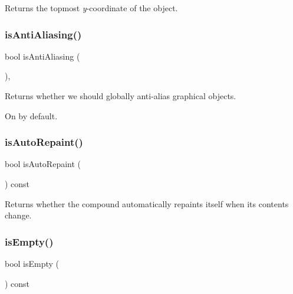 Returns the topmost {\itshape y}-\/coordinate of the object. 

\mbox{\label{classGObject_a93be0e1fe1b1bf1a1da732470c94f42b}} 
\subsubsection{\texorpdfstring{is\+Anti\+Aliasing()}{isAntiAliasing()}}
{\footnotesize\ttfamily bool is\+Anti\+Aliasing (\begin{DoxyParamCaption}{ }\end{DoxyParamCaption})\hspace{0.3cm}{\ttfamily [static]}, {\ttfamily [inherited]}}



Returns whether we should globally anti-\/alias graphical objects. 

On by default. \mbox{\label{classGCompound_a12c8d52ddfcaa5448ec4bace92ddee6c}} 
\subsubsection{\texorpdfstring{is\+Auto\+Repaint()}{isAutoRepaint()}}
{\footnotesize\ttfamily bool is\+Auto\+Repaint (\begin{DoxyParamCaption}{ }\end{DoxyParamCaption}) const\hspace{0.3cm}{\ttfamily [virtual]}}



Returns whether the compound automatically repaints itself when its contents change. 

\mbox{\label{classGCompound_acf82f9b2937375c7b1cf3dccb3df3312}} 
\subsubsection{\texorpdfstring{is\+Empty()}{isEmpty()}}
{\footnotesize\ttfamily bool is\+Empty (\begin{DoxyParamCaption}{ }\end{DoxyParamCaption}) const\hspace{0.3cm}{\ttfamily [virtual]}}



